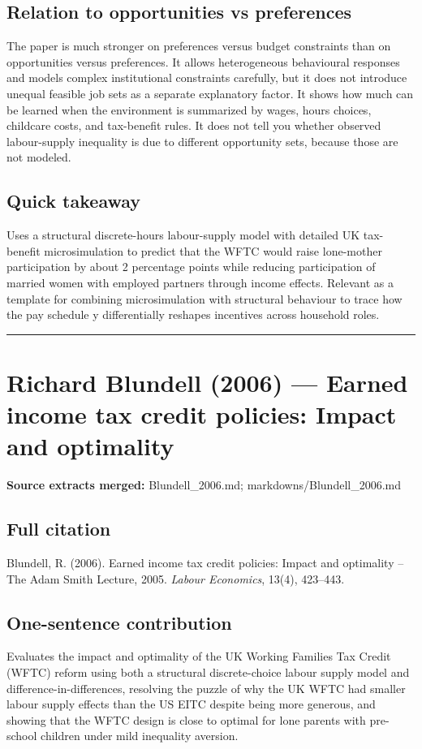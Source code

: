 \documentclass[11pt,a4paper]{article}
\begin{document}
\subsection*{Relation to opportunities vs preferences}
The paper is much stronger on preferences versus budget constraints than on opportunities versus preferences. It allows heterogeneous behavioural responses and models complex institutional constraints carefully, but it does not introduce unequal feasible job sets as a separate explanatory factor. It shows how much can be learned when the environment is summarized by wages, hours choices, childcare costs, and tax-benefit rules. It does not tell you whether observed labour-supply inequality is due to different opportunity sets, because those are not modeled.

\subsection*{Quick takeaway}
Uses a structural discrete-hours labour-supply model with detailed UK tax-benefit microsimulation to predict that the WFTC would raise lone-mother participation by about 2 percentage points while reducing participation of married women with employed partners through income effects. Relevant as a template for combining microsimulation with structural behaviour to trace how the pay schedule y differentially reshapes incentives across household roles.


\medskip\hrule\medskip

\section*{Richard Blundell (2006) — Earned income tax credit policies: Impact and optimality}

\textbf{Source extracts merged:} Blundell\_2006.md; markdowns/Blundell\_2006.md

\subsection*{Full citation}
Blundell, R. (2006). Earned income tax credit policies: Impact and optimality -- The Adam Smith Lecture, 2005. \textit{Labour Economics}, 13(4), 423--443.

\subsection*{One-sentence contribution}
Evaluates the impact and optimality of the UK Working Families Tax Credit (WFTC) reform using both a structural discrete-choice labour supply model and difference-in-differences, resolving the puzzle of why the UK WFTC had smaller labour supply effects than the US EITC despite being more generous, and showing that the WFTC design is close to optimal for lone parents with pre-school children under mild inequality aversion.
\end{document}
